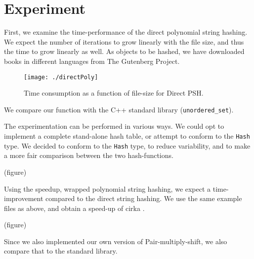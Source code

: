\documentclass[]{article}
\newcommand{\funk}[1]{\small\texttt{#1}}
\newcommand{\cpp}{C+\!+\xspace}
\begin{document}



\section{Experiment}
First, we examine the time-performance of the direct polynomial string hashing. We expect the number of iterations to grow linearly with the file size, and thus the time to grow linearly as well.
As objects to be hashed, we have downloaded books in different languages from The Gutenberg Project. 

\begin{figure}[H]
\centering
\texttt{[image: ./directPoly]}
\caption{Time consumption as a function of file-size for Direct PSH.}
\label{fig:directPoly}
\end{figure}

We compare our function with the \cpp standard library (\funk{unordered\_set}). %

The experimentation can be performed in various ways. We could opt to implement a complete stand-alone hash table, or attempt to conform to the \funk{Hash} type. We decided to conform to the \funk{Hash} type, to reduce variability, and to make a more fair comparison between the two hash-functions.



(figure)

Using the speedup, wrapped polynomial string hashing, we expect a time-improvement compared to the direct string hashing. We use the same example files as above, and obtain a speed-up of cirka . %

(figure)

Since we also implemented our own version of Pair-multiply-shift, we also compare that to the standard library. 
\end{document}
